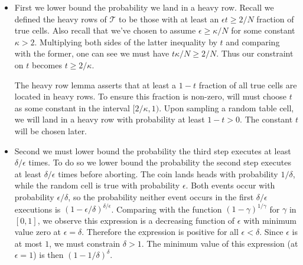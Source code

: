 \begin{itemize}
    \item
    First we lower bound the probability we land in a heavy row.
    Recall we  defined the heavy rows of $\mathcal{T}$ to be those with at least an $\epsilon t \geq 2/N$ fraction of true cells.
    Also recall that we've chosen to assume $\epsilon \geq \kappa/N$ for some constant $\kappa > 2$.
    Multiplying both sides of the latter inequality by $t$ and comparing with the former, one can see we must have $t\kappa/N \geq 2/N$.
    Thus our constraint on $t$ becomes $t \geq 2/\kappa$.

    The heavy row lemma asserts that at least a $1-t$ fraction of all true cells are located in heavy rows.
    To ensure this fraction is non-zero, will must choose $t$ as some constant in the interval $[2/\kappa,1)$.
    Upon sampling a random table cell, we will land in a heavy row with probability at least $1-t > 0$.
    The constant $t$ will be chosen later.

    \item
    Second we must lower bound the probability the third step executes at least $\delta/\epsilon$ times.
    To do so we lower bound the probability the second step executes at least $\delta/\epsilon$ times before aborting.
    The coin lands heads with probability $1/\delta$, while the random cell is true with probability $\epsilon$.
    Both events occur with probability $\epsilon/\delta$, so the probability neither event occurs in the first $\delta/\epsilon$ executions is $(1-\epsilon/\delta)^{\delta/\epsilon}$.
    Comparing with the function $(1-\gamma)^{1/\gamma}$ for $\gamma$ in $[0,1]$, we observe this expression is a decreasing function of $\epsilon$ with minimum value zero at $\epsilon = \delta$.
    Therefore the expression is positive for all $\epsilon < \delta$.
    Since $\epsilon$ is at most $1$, we must constrain $\delta > 1$.
    The minimum value of this expression (at $\epsilon = 1$) is then $(1-1/\delta)^\delta$.


\end{itemize}
